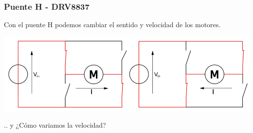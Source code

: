 \documentclass[compress]{beamer}
\begin{document}
\begin{frame}
 \frametitle{Puente H - DRV8837}
Con el puente H podemos cambiar el sentido y velocidad de los motores.
\begin{center}
 \includegraphics[width=\columnwidth]{./img/puenteH_2.png}
\end{center}
.. y ¿Cómo variamos la velocidad?

\end{frame}
\end{document}
